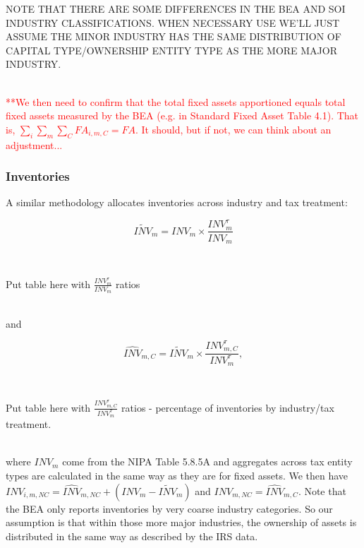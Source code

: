 \documentclass[article,11pt,letterpaper,fleqn]{article}
\theoremstyle{definition}
\numberwithin{equation}{section}
\begin{document}
NOTE THAT THERE ARE SOME DIFFERENCES IN THE BEA AND SOI INDUSTRY CLASSIFICATIONS.  WHEN NECESSARY USE WE'LL JUST ASSUME THE MINOR INDUSTRY HAS THE SAME DISTRIBUTION OF CAPITAL TYPE/OWNERSHIP ENTITY TYPE AS THE MORE MAJOR INDUSTRY.

\ \\
\textcolor{red}{**We then need to confirm that the total fixed assets apportioned equals total fixed assets measured by the BEA (e.g. in Standard Fixed Asset Table 4.1).  That is, $\sum_{i}\sum_{m}\sum_{C}{FA}_{i,m,C}=FA$. It should, but if not, we can think about an adjustment...}
\ \\


\subsubsection{Inventories}

A similar methodology allocates inventories across industry and tax treatment:  

\begin{equation}
\widetilde{INV}_{m}={INV}_{m}\times \frac{{INV}^{\tau}_{m}}{{INV}_{m}}
\end{equation}

\ \\
\begin{center}
Put table here with $\frac{{INV}^{\tau}_{m}}{{INV}_{m}}$ ratios 
\end{center}
\ \\

\noindent\noindent and 

\begin{equation}
\widehat{INV}_{m,C}=\widetilde{INV}_{m} \times \frac{{INV}^{\tau}_{m,C}}{{INV}^{\tau}_{m}},
\end{equation} 

\ \\
\begin{center}
Put table here with $\frac{{INV}^{\tau}_{m,C}}{{INV}^{\tau}_{m}}$ ratios - percentage of inventories by industry/tax treatment.
\end{center}
\ \\

\noindent\noindent where ${INV}_{m}$ come from the NIPA Table 5.8.5A and aggregates across tax entity types are calculated in the same way as they are for fixed assets.  We then have ${INV}_{i,m,NC}=\widehat{INV}_{m,NC}+({INV}_{m}-\widetilde{INV}_{m})$ and ${INV}_{m,NC}=\widehat{INV}_{m,C}$.  Note that the BEA only reports inventories by very coarse industry categories.  So our assumption is that within those more major industries, the ownership of assets is distributed in the same way as described by the IRS data.
\end{document}
